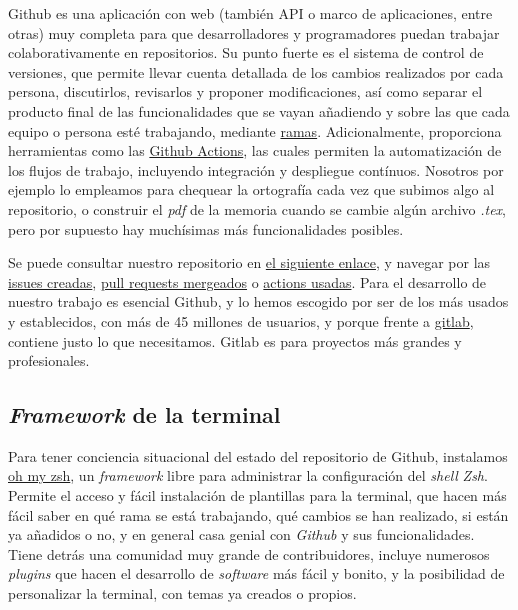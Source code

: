 Github es una aplicación con web (también API o marco de aplicaciones, entre otras) muy completa 
para que desarrolladores y programadores puedan trabajar colaborativamente 
en repositorios. Su punto fuerte es el sistema de control de versiones, que permite llevar 
cuenta detallada de los cambios realizados por cada persona, discutirlos, revisarlos y proponer 
modificaciones, así como 
separar el producto final de las funcionalidades que se vayan añadiendo y sobre las que cada equipo o persona 
esté trabajando, mediante \href{https://docs.github.com/pull-requests/collaborating-with-pull-requests/proposing-changes-to-your-work-with-pull-requests/about-branches}{ramas}. 
Adicionalmente, proporciona herramientas como las \href{https://github.com/features/actions}{Github Actions}, 
las cuales permiten la automatización de los flujos de trabajo, incluyendo integración y despliegue contínuos.
Nosotros por ejemplo lo empleamos para chequear la ortografía cada vez que subimos algo al repositorio, o construir el \textit{pdf}
de la memoria cuando se cambie algún archivo \textit{.tex}, pero por supuesto hay muchísimas más funcionalidades posibles.

Se puede consultar nuestro repositorio en \href{https://github.com/ElenaMerelo/TFG}{el siguiente enlace}, y navegar 
por las \href{https://github.com/ElenaMerelo/TFG/issues}{issues creadas}, \href{https://github.com/ElenaMerelo/TFG/pulls}{pull requests mergeados} 
o \href{https://github.com/ElenaMerelo/TFG/actions}{actions usadas}. Para el desarrollo de nuestro trabajo es esencial 
Github, y lo hemos escogido por ser de los más usados y establecidos, con más de 45 millones de usuarios, 
y porque frente a \href{https://about.gitlab.com/}{gitlab}, contiene justo lo que necesitamos. Gitlab es para proyectos 
más grandes y profesionales.

\subsection{\textit{Framework} de la terminal}
Para tener conciencia situacional del estado del repositorio de Github, instalamos \href{https://ohmyz.sh/}{oh my zsh}, 
un \textit{framework} libre para administrar la configuración del \textit{shell} \textit{Zsh}. Permite el 
acceso y fácil instalación de plantillas para la terminal, que hacen más fácil saber en qué rama se está 
trabajando, qué cambios se han realizado, si están ya añadidos o no, y en general casa genial con 
\textit{Github} y sus funcionalidades. Tiene detrás una comunidad muy grande de 
contribuidores, incluye numerosos \textit{plugins} que hacen el desarrollo de \textit{software} más fácil y bonito, 
y la posibilidad de personalizar la terminal, con temas ya creados o propios.


